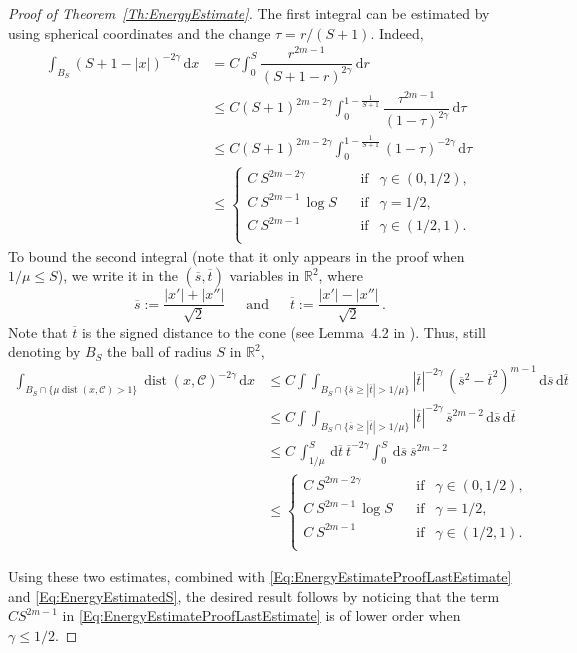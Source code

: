 \documentclass[12pt,reqno]{amsart}
\theoremstyle{definition}
\theoremstyle{remark}
\newcommand{\con}[1]{\mathbb{#1}}
\newcommand{\R}{\con{R}} %
\newcommand{\ccal}{\mathscr{C}}
\newcommand{\s}{\gamma}
\renewcommand{\d}{\,\mathrm{d}} %
\DeclareMathOperator{\dist}{dist}
\numberwithin{equation}{section}
\begin{document}
\begin{proof}[Proof of Theorem~\ref{Th:EnergyEstimate}]
		
		The first integral can be estimated by using spherical coordinates and the change $\tau = r/(S+1)$. Indeed,
		\begin{align*}
		\int_{B_S} \left( S+1-|x| \right)^{-2\s} \d x & = C \int_0^S \dfrac{r^{2m-1}}{(S+1-r)^{2\s}} \d r \\
		& \leq C (S+1)^{2m - 2\s}\int_0^{1 - \frac{1}{S+1}} \dfrac{\tau^{2m-1}}{(1-\tau)^{2\s}} \d \tau\\
		&\leq C (S+1)^{2m - 2\s}\int_0^{1 - \frac{1}{S+1}} (1-\tau)^{-2\s} \d \tau \\
		& \leq \begin{cases}
		C \ S^{2m-2\s}\ \ \ \ &\textrm{if } \ \ \s\in(0,1/2),\\
		C\ S^{2m-1}\,\log S\ \ \ \ &\textrm{if } \ \ \s=1/2,\\
		C \ S^{2m-1}\ \ \ \ &\textrm{if } \ \ \s\in(1/2,1).\\
		\end{cases}
		\end{align*}
		To bound the second integral (note that it only appears in the proof when $1/ \mu \leq S$), we write it in the $(\overline{s},\overline{t})$ variables in $\R^2$, where
		$$
		\overline{s} := \dfrac{|x'|+|x''|}{\sqrt{2}} \, \quad \text{ and } \, \quad  \overline{t} := \dfrac{|x'|-|x''|}{\sqrt{2}}\,.
		$$
		Note that $\overline{t}$ is the signed distance to the cone (see Lemma~4.2 in \cite{CabreTerraI}). Thus, still denoting by $B_S$ the ball of radius $S$ in $\R^2$,
		\begin{align*}
		\int_{B_{S}\cap \{\mu \dist(x,\ccal)>1\}} \dist(x,\ccal)^{-2\s} \d x &\leq C \int \int_{B_{S}\cap \{\overline{s}\geq|\overline{t}|>1/\mu\}} |\overline{t}|^{-2\s} \, (\overline{s}^2-\overline{t}^2)^{m-1} \d \overline{s}\d \overline{t} \\
		& \leq C \int \int_{B_{S}\cap \{\overline{s}\geq|\overline{t}|>1/\mu\}} |\overline{t}|^{-2\s} \, \overline{s}^{2m-2} \d \overline{s}\d \overline{t} \\
		& \leq C\, \int_{1/\mu}^S \d \overline{t}   \ \overline{t}^{-2\s}\int_0^S \d \overline{s}\  \overline{s}^{2m-2} \\
		& \leq \begin{cases}
		C \ S^{2m-2\s}\ \ \ \ &\textrm{if } \ \ \s\in(0,1/2),\\
		C\ S^{2m-1}\,\log S\ \ \ \ &\textrm{if } \ \ \s=1/2,\\
		C \ S^{2m-1}\ \ \ \ &\textrm{if } \ \ \s\in(1/2,1).\\
		\end{cases}
		\end{align*}
		
		Using these two estimates, combined with \eqref{Eq:EnergyEstimateProofLastEstimate} and \eqref{Eq:EnergyEstimatedS},  the desired result follows by noticing that the term $C S^{2m-1}$ in \eqref{Eq:EnergyEstimateProofLastEstimate} is of lower order when $\s \leq 1/2$.
	\end{proof}
	
\end{document}
